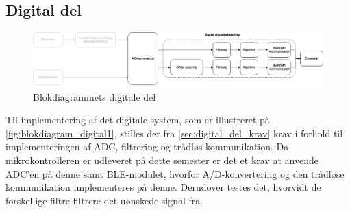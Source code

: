 \subsection{Digital del}

\begin{figure}[H]
\centering
\includegraphics[width=1\textwidth]{figures/implementering/Blokdiagram_digital.png}
\caption{Blokdiagrammets digitale del}
\label{fig:blokdiagram_digital1}
\end{figure}

Til implementering af det digitale system, som er illustreret på \autoref{fig:blokdiagram_digital1}, stilles der fra \autoref{sec:digital_del_krav} krav i forhold til implementeringen af ADC, filtrering og trådløs kommunikation. Da mikrokontrolleren er udleveret på dette semester er det et krav at anvende ADC'en på denne samt BLE-modulet, hvorfor A/D-konvertering og den trådløse kommunikation implementeres på denne. Derudover testes det, hvorvidt de forskellige filtre filtrere det uønskede signal fra. 



